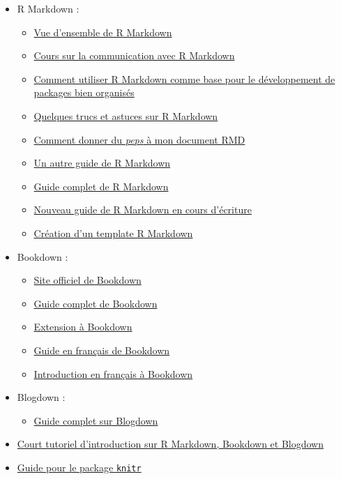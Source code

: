 \documentclass[
]{book}
\providecommand{\tightlist}{%
  \setlength{\itemsep}{0pt}\setlength{\parskip}{0pt}}
\begin{document}
\begin{itemize}
\tightlist
\item
  R Markdown :

  \begin{itemize}
  \tightlist
  \item
    \href{https://rmarkdown.rstudio.com/lesson-1.html}{Vue d'ensemble de R Markdown}
  \item
    \href{https://ysc-rmarkdown.netlify.app/}{Cours sur la communication avec R Markdown}
  \item
    \href{https://emilyriederer.netlify.app/post/rmarkdown-driven-development/}{Comment utiliser R Markdown comme base pour le développement de packages bien organisés}
  \item
    \href{https://www.dataquest.io/blog/r-markdown-tips-tricks-and-shortcuts/}{Quelques trucs et astuces sur R Markdown}
  \item
    \href{https://holtzy.github.io/Pimp-my-rmd/}{Comment donner du \emph{peps} à mon document RMD}
  \item
    \href{https://www.dataquest.io/blog/r-markdown-guide-cheatsheet/}{Un autre guide de R Markdown}
  \item
    \href{https://bookdown.org/yihui/rmarkdown/}{Guide complet de R Markdown}
  \item
    \href{https://bookdown.org/yihui/rmarkdown-cookbook/}{Nouveau guide de R Markdown en cours d'écriture}
  \item
    \href{https://danawanzer.com/using-r-for-immediate-reporting-in-evaluation/}{Création d'un template R Markdown}
  \end{itemize}
\item
  Bookdown :

  \begin{itemize}
  \tightlist
  \item
    \href{https://bookdown.org/home/about/}{Site officiel de Bookdown}
  \item
    \href{https://bookdown.org/yihui/bookdown/}{Guide complet de Bookdown}
  \item
    \href{https://github.com/pzhaonet/bookdownplus}{Extension à Bookdown}
  \item
    \href{https://statistique-et-logiciel-r.com/creer-un-livre-document-avec-bookdown/}{Guide en français de Bookdown}
  \item
    \href{https://thinkr.fr/rediger-avec-bookdown-pourquoi-comment/}{Introduction en français à Bookdown}
  \end{itemize}
\item
  Blogdown :

  \begin{itemize}
  \tightlist
  \item
    \href{https://bookdown.org/yihui/blogdown/}{Guide complet sur Blogdown}
  \end{itemize}
\item
  \href{https://slides.yihui.org/2017-rmarkdown-UNL-Yihui-Xie.html\#1}{Court tutoriel d'introduction sur R Markdown, Bookdown et Blogdown}
\item
  \href{https://yihui.org/knitr/}{Guide pour le package \texttt{knitr}}
\end{itemize}
\end{document}
